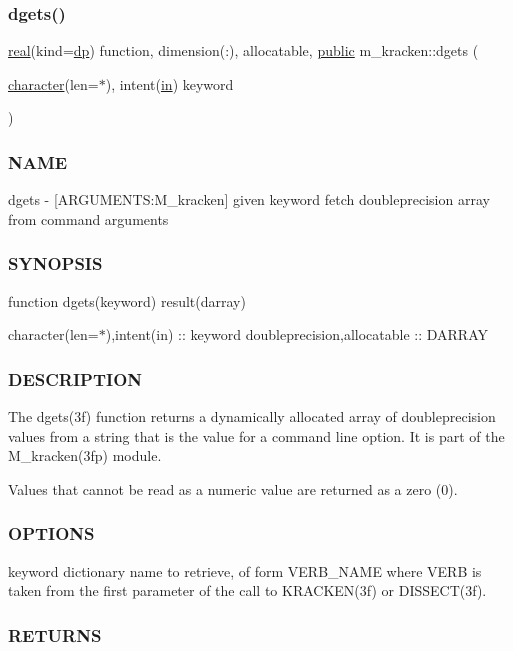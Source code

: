 \subsubsection{\texorpdfstring{dgets()}{dgets()}}
{\footnotesize\ttfamily \hyperlink{read__watch_83_8txt_abdb62bde002f38ef75f810d3a905a823}{real}(kind=\hyperlink{namespacem__kracken_a1de91e5ca55bf4fab118936bf4fad36a}{dp}) function, dimension(\+:), allocatable, \hyperlink{M__stopwatch_83_8txt_a2f74811300c361e53b430611a7d1769f}{public} m\+\_\+kracken\+::dgets (\begin{DoxyParamCaption}\item[{\hyperlink{option__stopwatch_83_8txt_abd4b21fbbd175834027b5224bfe97e66}{character}(len=$\ast$), intent(\hyperlink{M__journal_83_8txt_afce72651d1eed785a2132bee863b2f38}{in})}]{keyword }\end{DoxyParamCaption})}



\subsubsection*{N\+A\+ME}

dgets -\/ \mbox{[}A\+R\+G\+U\+M\+E\+N\+TS\+:M\+\_\+kracken\mbox{]} given keyword fetch doubleprecision array from command arguments \subsubsection*{S\+Y\+N\+O\+P\+S\+IS}

function dgets(keyword) result(darray)

character(len=$\ast$),intent(in) \+:\+: keyword doubleprecision,allocatable \+:\+: D\+A\+R\+R\+AY

\subsubsection*{D\+E\+S\+C\+R\+I\+P\+T\+I\+ON}

The dgets(3f) function returns a dynamically allocated array of doubleprecision values from a string that is the value for a command line option. It is part of the M\+\_\+kracken(3fp) module.

Values that cannot be read as a numeric value are returned as a zero (0). \subsubsection*{O\+P\+T\+I\+O\+NS}

keyword dictionary name to retrieve, of form V\+E\+R\+B\+\_\+\+N\+A\+ME where V\+E\+RB is taken from the first parameter of the call to K\+R\+A\+C\+K\+E\+N(3f) or D\+I\+S\+S\+E\+C\+T(3f). \subsubsection*{R\+E\+T\+U\+R\+NS}

